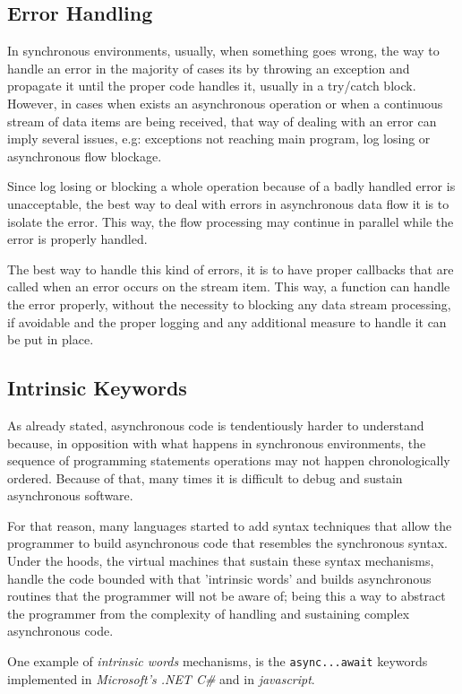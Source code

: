 	\clearpage
	\subsection{Error Handling}  
	In synchronous environments, usually, when something goes wrong, the way to handle an error in the majority of cases its by throwing an exception and propagate it until the proper code handles it, usually  in a try/catch block. 
	However, in cases when exists an asynchronous operation or when a continuous stream of data items are being received, that way of dealing with an error can imply several issues, e.g: exceptions not reaching main program, log losing or asynchronous flow blockage. 
	
	Since log losing or blocking a whole operation because of a badly handled error is unacceptable, the best way to deal with errors in asynchronous data flow it is to isolate the error. This way, the flow processing may continue in parallel while the error is properly handled.
	
	The best way to handle this kind of errors, it is to have proper callbacks that are called when an error occurs on the stream item. This way, a function can handle the error properly, without the necessity to blocking any data stream processing, if avoidable and the proper logging and any additional measure to handle it can be put in place.
	\clearpage
	

	\subsection{Intrinsic Keywords} 
	
	As already stated, asynchronous code is tendentiously harder to understand because, in opposition with what happens in synchronous environments, the sequence of programming statements operations may not happen chronologically ordered. 
	Because of that, many times it is difficult to debug and sustain asynchronous software. 

	For that reason, many languages started to add syntax techniques that allow the programmer to build asynchronous code that resembles the synchronous syntax.
	Under the hoods, the virtual machines that sustain these syntax mechanisms, handle the code bounded with that 'intrinsic words' and builds asynchronous routines that the programmer will not be aware of;
	being this a way to abstract the programmer from the complexity of handling and sustaining complex asynchronous code. 

	One example of \textit{intrinsic words} mechanisms, is the \texttt{async...await} keywords implemented in \textit{Microsoft's .NET C\#} and in \textit{javascript}. 
	
